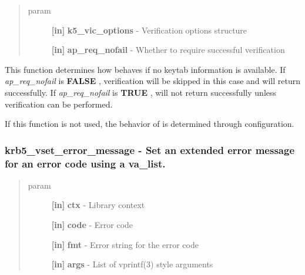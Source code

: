 \documentclass[letterpaper,10pt,english]{sphinxmanual}
\begin{document}
\begin{quote}\begin{description}
\item[{param}] \leavevmode
\textbf{{[}in{]}} \textbf{k5\_vic\_options} - Verification options structure

\textbf{{[}in{]}} \textbf{ap\_req\_nofail} - Whether to require successful verification

\end{description}\end{quote}

This function determines how {\hyperref[appdev/refs/api/krb5_verify_init_creds:c.krb5_verify_init_creds]{}} behaves if no keytab information is available. If \emph{ap\_req\_nofail} is \textbf{FALSE} , verification will be skipped in this case and {\hyperref[appdev/refs/api/krb5_verify_init_creds:c.krb5_verify_init_creds]{}} will return successfully. If \emph{ap\_req\_nofail} is \textbf{TRUE} , {\hyperref[appdev/refs/api/krb5_verify_init_creds:c.krb5_verify_init_creds]{}} will not return successfully unless verification can be performed.

If this function is not used, the behavior of {\hyperref[appdev/refs/api/krb5_verify_init_creds:c.krb5_verify_init_creds]{}} is determined through configuration.


\subsubsection{krb5\_vset\_error\_message -  Set an extended error message for an error code using a va\_list.}
\label{appdev/refs/api/krb5_vset_error_message:krb5-vset-error-message-set-an-extended-error-message-for-an-error-code-using-a-va-list}\label{appdev/refs/api/krb5_vset_error_message::doc}

\begin{fulllineitems}
\label{appdev/refs/api/krb5_vset_error_message:c.krb5_vset_error_message}
\end{fulllineitems}

\begin{quote}\begin{description}
\item[{param}] \leavevmode
\textbf{{[}in{]}} \textbf{ctx} - Library context

\textbf{{[}in{]}} \textbf{code} - Error code

\textbf{{[}in{]}} \textbf{fmt} - Error string for the error code

\textbf{{[}in{]}} \textbf{args} - List of vprintf(3) style arguments

\end{description}\end{quote}
\end{document}
